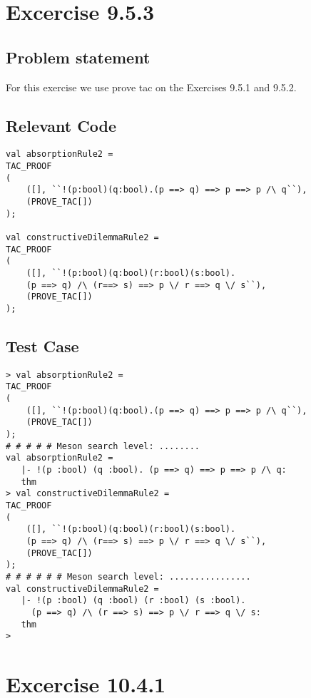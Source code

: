 \documentclass{report}
\begin{document}
\chapter{Excercise 9.5.3}
\label{cha:9-5-3}

\section{Problem statement}
\label{problem-statement-9-5-3}
For this exercise we use prove tac on the Exercises 9.5.1 and 9.5.2.

\section{Relevant Code}
\label{rel-code-9-5-3}
\begin{lstlisting}[frame=TBlr]
val absorptionRule2 =
TAC_PROOF
(
	([], ``!(p:bool)(q:bool).(p ==> q) ==> p ==> p /\ q``),
	(PROVE_TAC[])
);

val constructiveDilemmaRule2 =
TAC_PROOF
(
	([], ``!(p:bool)(q:bool)(r:bool)(s:bool).
	(p ==> q) /\ (r==> s) ==> p \/ r ==> q \/ s``),
	(PROVE_TAC[])
);
\end{lstlisting}

\section{Test Case}
\label{trans-9-5-3}
\begin{session}
  \begin{scriptsize}
\begin{verbatim}
> val absorptionRule2 =
TAC_PROOF
(
	([], ``!(p:bool)(q:bool).(p ==> q) ==> p ==> p /\ q``),
	(PROVE_TAC[])
);
# # # # # Meson search level: ........
val absorptionRule2 =
   |- !(p :bool) (q :bool). (p ==> q) ==> p ==> p /\ q:
   thm
> val constructiveDilemmaRule2 =
TAC_PROOF
(
	([], ``!(p:bool)(q:bool)(r:bool)(s:bool).
	(p ==> q) /\ (r==> s) ==> p \/ r ==> q \/ s``),
	(PROVE_TAC[])
);
# # # # # # Meson search level: ................
val constructiveDilemmaRule2 =
   |- !(p :bool) (q :bool) (r :bool) (s :bool).
     (p ==> q) /\ (r ==> s) ==> p \/ r ==> q \/ s:
   thm
> 
\end{verbatim}
  \end{scriptsize}
\end{session}

\chapter{Excercise 10.4.1}
\label{cha:10-4-1}
\end{document}
